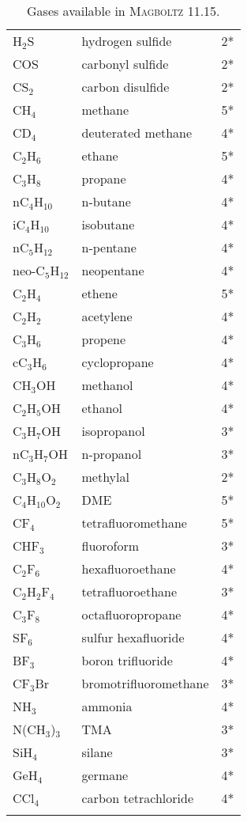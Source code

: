 \begin{appendix}
\begin{longtable}{l l l}
  H\(_{2}\)S & hydrogen sulfide & 2* \\
  COS        & carbonyl sulfide & 2* \\
  CS\(_{2}\) & carbon disulfide & 2* \\
  \midrule
  CH\(_{4}\)           & methane   & 5* \\
  CD\(_{4}\)           & deuterated methane & 4* \\
  C\(_{2}\)H\(_{6}\)   & ethane    & 5* \\
  C\(_{3}\)H\(_{8}\)   & propane   & 4* \\
  nC\(_{4}\)H\(_{10}\) & n-butane  & 4* \\
  iC\(_{4}\)H\(_{10}\) & isobutane & 4* \\ 
  nC\(_{5}\)H\(_{12}\) & n-pentane & 4* \\  
  neo-C\(_{5}\)H\(_{12}\) & neopentane & 4* \\
  C\(_{2}\)H\(_{4}\)   & ethene    & 5* \\
  C\(_{2}\)H\(_{2}\)   & acetylene & 4* \\
  C\(_{3}\)H\(_{6}\)   & propene   & 4* \\
  cC\(_{3}\)H\(_{6}\)   & cyclopropane & 4* \\
  \midrule
  CH\(_{3}\)OH         & methanol        & 4* \\
  C\(_{2}\)H\(_{5}\)OH & ethanol         & 4* \\
  C\(_{3}\)H\(_{7}\)OH & isopropanol     & 3* \\
  nC\(_{3}\)H\(_{7}\)OH & n-propanol     & 3* \\
  C\(_{3}\)H\(_{8}\)O\(_{2}\)  & methylal & 2* \\
  C\(_{4}\)H\(_{10}\)O\(_{2}\) & DME      & 5* \\
  \midrule
  CF\(_{4}\)           & tetrafluoromethane & 5* \\
  CHF\(_{3}\)          & fluoroform         & 3* \\
  C\(_{2}\)F\(_{6}\)   & hexafluoroethane   & 4* \\
  C\(_{2}\)H\(_{2}\)F\(_{4}\) & tetrafluoroethane & 3* \\
  C\(_{3}\)F\(_{8}\)   & octafluoropropane  & 4* \\
  SF\(_{6}\)           & sulfur hexafluoride  & 4* \\
  BF\(_{3}\)           & boron trifluoride    & 4* \\ 
  CF\(_{3}\)Br         & bromotrifluoromethane & 3* \\
  \midrule
  NH\(_{3}\)            & ammonia  & 4* \\
  N(CH\(_{3}\))\(_{3}\) & TMA      & 3* \\
  SiH\(_{4}\)           & silane   & 3* \\
  GeH\(_{4}\)           & germane  & 4* \\
  CCl\(_{4}\)           & carbon tetrachloride & 4* \\ 
  \bottomrule
  \caption{Gases available in \textsc{Magboltz} 11.15.} 
  \label{Tab:GasesMagboltz11}
\end{longtable}


\end{appendix}

